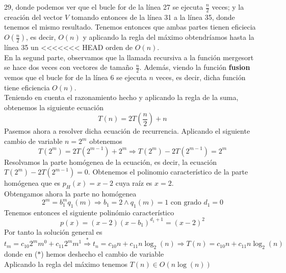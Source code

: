 \documentclass[11pt]{article}
\begin{document}
        29, donde podemos ver que el bucle for de la línea 27 se ejecuta $\frac{n}{2}$ veces; y la creación del vector 
        $V$ tomando entonces de la línea 31 a la línea 35, donde tenemos el mismo resultado. Tenemos entonces que ambas partes 
        tienen eficiecia $O(\frac{n}{2})$, es decir, $O(n)$ y aplicando la regla del máximo obtendríamos hasta la línea 35 un
<<<<<<< HEAD
        orden de $O(n)$. \\
        En la segund parte, observamos que la llamada recursiva a la función mergesort se hace dos veces con vectores de tamaño $\frac{n}{2}$.
        Además, viendo la función \textbf{fusion} vemos que el bucle for de la línea 6 se ejecuta $n$ veces, es decir, dicha función
        tiene eficiencia $O(n)$. \\
        Teniendo en cuenta el razonamiento hecho y aplicando la regla de la suma, obtenemos la siguiente ecuación
        \begin{equation*}
            T(n)=2T(\frac{n}{2})+n
        \end{equation*}
        Pasemos ahora a resolver dicha ecuación de recurrencia. Aplicando el siguiente cambio de variable $n=2^m$ obtenemos
        \begin{equation*}
            T(2^m)=2T(2^{m-1})+2^m \Longrightarrow T(2^m)-2T(2^{m-1})=2^m
        \end{equation*}
        Resolvamos la parte homógenea de la ecuación, es decir, la ecuación $T(2^m)-2T(2^{m-1})=0$. Obtenemos el polinomio
        característico de la parte homógenea que es $p_H(x)=x-2$ cuya raíz es $x=2$. \\
        Obtengamos ahora la parte no homógenea
        \begin{equation*}
            2^m=b_1^m q_1(m) \Longrightarrow b_1=2 \wedge q_1(m)=1 \text{ con grado } d_1=0
        \end{equation*}
        Tenemos entonces el siguiente polinómio característico
        \begin{equation*}
            p(x)=(x-2)(x-b_1)^{d_1+1}=(x-2)^2
        \end{equation*}
        Por tanto la solución general es
        \begin{equation*}
            t_m=c_{10}2^mm^0+c_{11}2^mm^1  \overset{*}{\Longrightarrow}  t_n=c_{10}n+c_{11}n\log_2(n) \Longrightarrow T(n)=c_{10}n+c_{11}n\log_2(n)
        \end{equation*}
        donde en ($*$) hemos deshecho el cambio de variable \\
        Aplicando la regla del máximo tenemos $T(n) \in O(n\log(n))$
\end{document}
